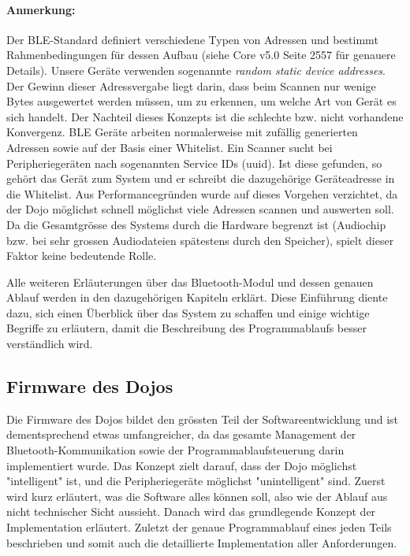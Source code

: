 \paragraph{Anmerkung: }Der BLE-Standard definiert verschiedene Typen von Adressen und bestimmt Rahmenbedingungen für dessen Aufbau (siehe Core v5.0 Seite 2557 \cite{BLE_SPEC} für genauere Details). Unsere Geräte verwenden sogenannte \textit{random static device addresses}.
Der Gewinn dieser Adressvergabe liegt darin, dass beim Scannen nur wenige Bytes ausgewertet werden müssen, um zu erkennen, um welche Art von Gerät es sich handelt.
Der Nachteil dieses Konzepts ist die schlechte bzw. nicht vorhandene Konvergenz. BLE Geräte arbeiten normalerweise mit zufällig generierten Adressen sowie auf der Basis einer Whitelist. Ein Scanner sucht bei Peripheriegeräten nach sogenannten Service IDs (uuid). Ist diese gefunden, so gehört das Gerät zum System und er schreibt die dazugehörige Geräteadresse in die Whitelist. Aus Performancegründen wurde auf dieses Vorgehen verzichtet, da der Dojo möglichst schnell möglichst viele Adressen scannen und auswerten soll. Da die Gesamtgrösse des Systems durch die Hardware begrenzt ist (Audiochip bzw. bei sehr grossen Audiodateien spätestens durch den Speicher), spielt dieser Faktor keine bedeutende Rolle. 
\vspace{1cm}


Alle weiteren Erläuterungen über das Bluetooth-Modul und dessen genauen Ablauf werden in den dazugehörigen Kapiteln erklärt. Diese Einführung diente dazu, sich einen Überblick über das System zu schaffen und einige wichtige Begriffe zu erläutern, damit die Beschreibung des Programmablaufs besser verständlich wird. 

\subsection{Firmware des Dojos}
Die Firmware des Dojos bildet den grössten Teil der Softwareentwicklung und ist dementsprechend etwas umfangreicher, da das gesamte Management der Bluetooth-Kommunikation sowie der Programmablaufsteuerung darin implementiert wurde. Das Konzept zielt darauf, dass der Dojo möglichst "intelligent" ist, und die Peripheriegeräte möglichst "unintelligent" sind. 
Zuerst wird kurz erläutert, was die Software alles können soll, also wie der Ablauf aus nicht technischer Sicht aussieht. Danach wird das grundlegende Konzept der Implementation erläutert. Zuletzt der genaue Programmablauf eines jeden Teils beschrieben und somit auch die detaillierte Implementation aller Anforderungen.
